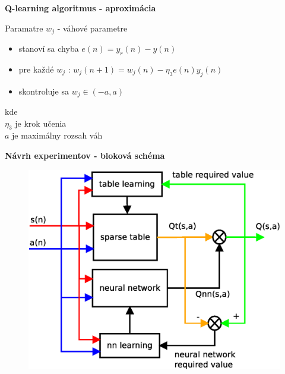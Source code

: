 \documentclass[xcolor=dvipsnames]{beamer}
\begin{document}
\begin{frame}{\bf Q-learning algoritmus - aproximácia}

Paramatre $w_{j}$ - váhové parametre

\begin{itemize}
\item stanoví sa chyba $e(n) = y_r(n) - y(n)$
\item pre každé $w_{j}$ : $w_j(n+1)= w_j(n) -\eta_3 e(n)y_j(n)$
\item skontroluje sa $w_j \in (-a, a)$
\end{itemize}

kde \\
$\eta_3$ je krok učenia \\
$a$ je maximálny rozsah váh \\
\end{frame}


\begin{frame}{\bf Návrh experimentov - bloková schéma}

\begin{figure}[!htb]
\centering
\includegraphics[scale=.4]{../diagrams/q_learning_hybrid.eps}
\end{figure}

\end{frame}
\end{document}

